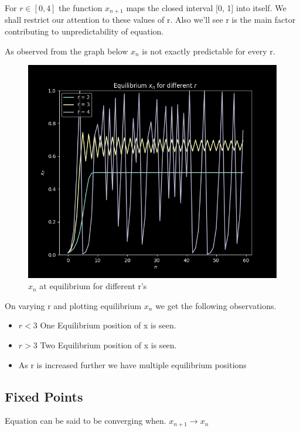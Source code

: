 \documentclass{report}
\begin{document}
For $r \in [0, 4]$ the function $x_{n+1}$ maps the closed interval [0, 1] into itself. We shall
restrict our attention to these values of r. Also we'll see r is the main factor contributing to unpredictability of equation.

As observed from the graph below $x_{n}$ is not exactly predictable for every r.

\begin{figure}[!h]
    \centering
    \includegraphics[scale=.4]{images/eqfordifr.png}
    \caption{$x_n$ at equilibrium for different r's}
    \label{fig:my_label2}
\end{figure}

On varying r and plotting equilibrium $x_{n}$ we get the following observations.

\begin{itemize}
  \item $r < 3$ One Equilibrium position of x is seen.
  \item $r > 3$ Two Equilibrium position of x is seen.
  \item As r is increased further we have multiple equilibrium positions
\end{itemize}
\newpage
\subsection{Fixed Points}

\raggedright

Equation can be said to be converging when. $x_{n+1} \to x_n$
\end{document}
